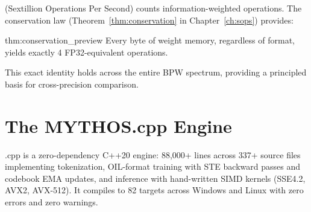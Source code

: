 \SOPS{} (Sextillion Operations Per Second) counts information-weighted
operations. The conservation law (Theorem~\ref{thm:conservation} in
Chapter~\ref{ch:sops}) provides:

\begin{mythm}{thm:conservation_preview}
Every byte of weight memory, regardless of format, yields exactly 4
FP32-equivalent operations.
\end{mythm}

This exact identity holds across the entire BPW spectrum, providing a
principled basis for cross-precision comparison.

\section{The MYTHOS.cpp Engine}
\label{sec:mythos_engine}

\MYTHOS{}.cpp is a zero-dependency C++20 engine: 88{,}000+ lines across
337+ source files implementing tokenization, OIL-format training with STE
backward passes and codebook EMA updates, and inference with hand-written
SIMD kernels (SSE4.2, AVX2, AVX-512). It compiles to 82 targets across
Windows and Linux with zero errors and zero warnings.

